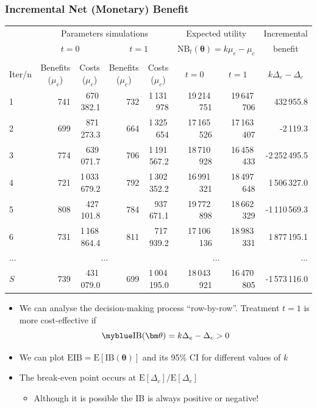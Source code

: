 \begin{frame}
\frametitle{Incremental Net (Monetary) Benefit}

{\centering
\fontsize{6.5}{7.5}\selectfont 
\begin{tabular*}{.95\textwidth}{@{\extracolsep{\fill}}lrrrrrrr}
\hline
& \multicolumn{4}{c}{Parameters simulations} & \multicolumn{2}{c}{Expected utility} & \multicolumn{1}{c}{Incremental}  \\
& \multicolumn{2}{c}{$t=0$} & \multicolumn{2}{c}{$t=1$} & \multicolumn{2}{c}{$\mbox{NB}_t(\bm\theta) =k\mu_e-\mu_c$} & \multicolumn{1}{c}{benefit} \\
\cline{2-3} \cline{4-5} \\[-5pt]
Iter/n & \multicolumn{1}{c}{Benefits ($\mu_e$)} & \multicolumn{1}{c}{Costs ($\mu_c$)} & \multicolumn{1}{c}{Benefits ($\mu_e$)} & \multicolumn{1}{c}{Costs ($\mu_c$)} &
\multicolumn{1}{c}{$t=0$} & \multicolumn{1}{c}{$t=1$} & \multicolumn{1}{c}{$k\Delta_e-\Delta_c$} \\
\hline
1 & 741 & 670\,382.1 & 732 & 1\,131\,978 & 19\,214\,751 & 19\,647\,706 &  432\,955.8 \\
2 & 699 & 871\,273.3 & 664 & 1\,325\,654 & 17\,165\,526 & 17\,163\,407 & -2\,119.3 \\
3 & 774 & 639\,071.7 & 706 & 1\,191\,567.2 & 18\,710\,928 & 16\,458\,433 & -2\,252\,495.5 \\
4 & 721 & 1\,033\,679.2 & 792 & 1\,302\,352.2 & 16\,991\,321 & 18\,497\,648 &  1\,506\,327.0 \\
5 & 808 & 427\,101.8 & 784 & 937\,671.1 & 19\,772\,898 & 18\,662\,329 & -1\,110\,569.3 \\
6 & 731 & 1\,168\,864.4 & 811 & 717\,939.2 & 17\,106\,136 & 18\,983\,331 &  1\,877\,195.1 \\
$\ldots$ & \multicolumn{4}{c}{$\ldots$} & \multicolumn{2}{c}{$\ldots$} & $\ldots$ \\
$S$ & 739 & 431\,079.0 & 699 & 1\,004\,195.0 & 18\,043\,921 & 16\,470\,805 & -1\,573\,116.0 \\
\hline
\end{tabular*}
}

\vfill
\begin{itemize}
\item We can analyse the decision-making process ``row-by-row''. Treatment $t=1$ is more cost-effective if 
\[ \myblue \mbox{IB}(\bm\theta) = k\Delta_e - \Delta_c > 0 \]
\item We can plot $\mbox{EIB}=\mbox{E}[\mbox{IB}(\bm\theta)]$ and its 95\% CI for different values of $k$
\item The break-even point occurs at $\mbox{E}[\Delta_{c}]/\mbox{E}[\Delta_{e}]$ 
\begin{itemize}
\item Although it is possible the IB is always positive or negative!
\end{itemize}
\end{itemize}

\end{frame}

